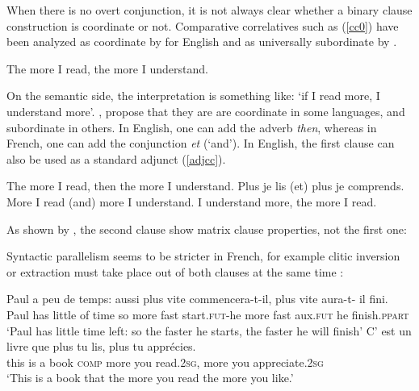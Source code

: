 \documentclass[output=paper
                ,modfonts
                ,nonflat
	        ,collection
	        ,collectionchapter
	        ,collectiontoclongg
 	        ,biblatex
                ,babelshorthands
                ,newtxmath
                ,draftmode
                ,colorlinks, citecolor=brown
]{./langsci/langscibook}
\begin{document}
When there is no overt conjunction, it is not always clear whether a binary clause construction is coordinate or not. Comparative correlatives such as (\ref{cc0}) have been analyzed as coordinate by \citet{culijack} for English and as universally subordinate  by \citet{dikken}. 

\begin{exe}
\ex The more I read, the more I understand. \label{cc0}
\end{exe}

On the semantic side, the interpretation is something like: `if I read more, I understand more'. \citet{Abeille:06}, \citet{Abeille:Borsley:08} propose that they are are coordinate in some languages, 
 and subordinate in others. In English, one can add the adverb \emph{then}, whereas in French, one can add the conjunction \emph{et} (`and'). In English, the first clause can also be used as a standard adjunct (\ref{adjcc}).
 
 
 
 \begin{exe}
 \ex
\begin{xlista}
\ex The more I read, then the more I understand.
\ex Plus je lis (et) plus je comprends.\\
More I read (and) more I understand.
\ex I understand more, the more I read.
\end{xlista}\label{adjcc}
\end{exe}

As shown by \citet[549-550]{culijack}, the second clause show matrix clause properties, not the first one:

\begin{exe}
 \ex
\begin{xlista}
\end{xlista}
\end{exe}

Syntactic parallelism seems to be stricter in French, for example clitic inversion or extraction must take place out of both clauses at the same time \citep{Abeille:Borsley:08}:

\begin{exe}
 \ex
\begin{xlista}
\ex \gll Paul a     peu  de temps: aussi plus  vite commencera-t-il,  plus   vite  aura-t-      il  fini.\\
Paul has little of time so more fast start.\textsc{fut}-he more fast  aux.\textsc{fut} he finish.\textsc{ppart} \\
\glt `Paul has little time left: so the faster he starts, the faster he will finish'
\ex \gll C'   est un livre  que      plus   tu    lis, plus  tu    appr\'{e}cies. \\
this is    a  book \textsc{comp} more you read.2\textsc{sg},  more you appreciate.2\textsc{sg} \\
\glt `This is a book that the more you read the more you like.'
\end{xlista}
\end{exe}
\end{document}
